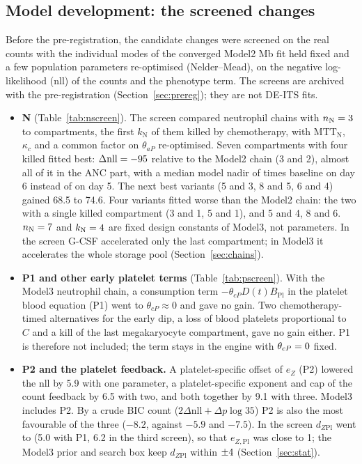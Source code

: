 \documentclass[11pt]{article}
\begin{document}
\subsection{Model development: the screened changes}\label{sec:development}
Before the pre-registration, the candidate changes were screened on the real counts with the individual modes of the converged Model2 Mb fit held fixed and a few population parameters re-optimised (Nelder--Mead), on the negative log-likelihood (nll) of the counts and the phenotype term. The screens are archived with the pre-registration (Section~\ref{sec:prereg}); they are not DE-ITS fits.
\begin{itemize}
\item \textbf{N} (Table~\ref{tab:nscreen}). The screen compared \valNScreenN{} neutrophil chains with $n_{\mathrm{N}}=3$ to \valNScreenNMax{} compartments, the first $k_{\mathrm{N}}$ of them killed by chemotherapy, with $\mathrm{MTT}_{\mathrm{N}}$, $\kappa_c$ and a common factor on $\theta_{aP}$ re-optimised. Seven compartments with four killed fitted best: $\Delta\mathrm{nll}=-95$ relative to the Model2 chain (3 and 2), almost all of it in the ANC part, with a median model nadir of \valNScreenNadir{} times baseline on day 6 instead of \valNScreenRefNadir{} on day 5. The next best variants (5 and 3, 8 and 5, 6 and 4) gained 68.5 to 74.6. Four variants fitted worse than the Model2 chain: the two with a single killed compartment (3 and 1, 5 and 1), and 5 and 4, 8 and 6. $n_{\mathrm{N}}=7$ and $k_{\mathrm{N}}=4$ are fixed design constants of Model3, not parameters. In the screen G-CSF accelerated only the last compartment; in Model3 it accelerates the whole storage pool (Section~\ref{sec:chains}).
\item \textbf{P1 and other early platelet terms} (Table~\ref{tab:pscreen}). With the Model3 neutrophil chain, a consumption term $-\theta_{cP}D(t)B_{\mathrm{Pl}}$ in the platelet blood equation (P1) went to $\theta_{cP}\approx0$ and gave no gain. Two chemotherapy-timed alternatives for the early dip, a loss of blood platelets proportional to $C$ and a kill of the last megakaryocyte compartment, gave no gain either. P1 is therefore not included; the term stays in the engine with $\theta_{cP}=0$ fixed.
\item \textbf{P2 and the platelet feedback.} A platelet-specific offset of $e_Z$ (P2) lowered the nll by 5.9 with one parameter, a platelet-specific exponent and cap of the count feedback by 6.5 with two, and both together by 9.1 with three. Model3 includes P2. By a crude BIC count ($2\Delta\mathrm{nll}+\Delta p\log 35$) P2 is also the most favourable of the three ($-8.2$, against $-5.9$ and $-7.5$). In the screen $d_{Z\mathrm{Pl}}$ went to \valPScreenDzpl{} (5.0 with P1, 6.2 in the third screen), so that $e_{Z,\mathrm{Pl}}$ was close to 1; the Model3 prior and search box keep $d_{Z\mathrm{Pl}}$ within $\pm4$ (Section~\ref{sec:stat}).
\end{itemize}
\end{document}
